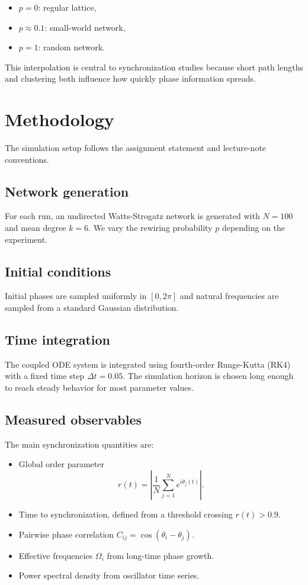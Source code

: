 \documentclass[12pt]{article}
\begin{document}
\begin{itemize}
	\item $p=0$: regular lattice,
	\item $p\approx 0.1$: small-world network,
	\item $p=1$: random network.
\end{itemize}

This interpolation is central to synchronization studies because short path lengths and clustering both influence how quickly phase information spreads.

\section{Methodology}

The simulation setup follows the assignment statement and lecture-note conventions.

\subsection{Network generation}
For each run, an undirected Watts-Strogatz network is generated with $N=100$ and mean degree $k=6$. We vary the rewiring probability $p$ depending on the experiment.

\subsection{Initial conditions}
Initial phases are sampled uniformly in $[0,2\pi]$ and natural frequencies are sampled from a standard Gaussian distribution.

\subsection{Time integration}
The coupled ODE system is integrated using fourth-order Runge-Kutta (RK4) with a fixed time step $\Delta t=0.05$. The simulation horizon is chosen long enough to reach steady behavior for most parameter values.

\subsection{Measured observables}
The main synchronization quantities are:

\begin{itemize}
	\item Global order parameter
	\begin{equation}
	r(t) = \left|\frac{1}{N}\sum_{j=1}^{N} e^{i\theta_j(t)}\right|.
	\end{equation}
	\item Time to synchronization, defined from a threshold crossing $r(t)>0.9$.
	\item Pairwise phase correlation $C_{ij}=\cos(\theta_i-\theta_j)$.
	\item Effective frequencies $\Omega_i$ from long-time phase growth.
	\item Power spectral density from oscillator time series.
\end{itemize}
\end{document}
